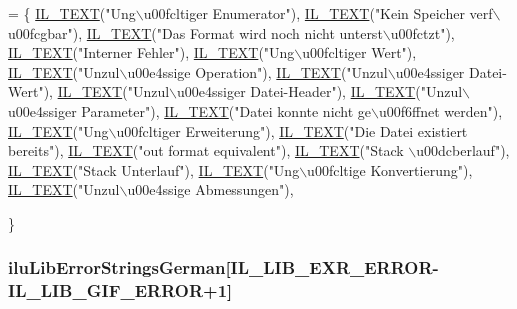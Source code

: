 \begin{DoxyCode}
= \{
    \hyperlink{il_8h_a2907c2129d2ba2ebbae6aa6a69b7f685}{IL\_TEXT}(\textcolor{stringliteral}{"Ung\(\backslash\)u00fcltiger Enumerator"}),
  \hyperlink{il_8h_a2907c2129d2ba2ebbae6aa6a69b7f685}{IL\_TEXT}(\textcolor{stringliteral}{"Kein Speicher verf\(\backslash\)u00fcgbar"}),
    \hyperlink{il_8h_a2907c2129d2ba2ebbae6aa6a69b7f685}{IL\_TEXT}(\textcolor{stringliteral}{"Das Format wird noch nicht unterst\(\backslash\)u00fctzt"}),
    \hyperlink{il_8h_a2907c2129d2ba2ebbae6aa6a69b7f685}{IL\_TEXT}(\textcolor{stringliteral}{"Interner Fehler"}),
    \hyperlink{il_8h_a2907c2129d2ba2ebbae6aa6a69b7f685}{IL\_TEXT}(\textcolor{stringliteral}{"Ung\(\backslash\)u00fcltiger Wert"}),
  \hyperlink{il_8h_a2907c2129d2ba2ebbae6aa6a69b7f685}{IL\_TEXT}(\textcolor{stringliteral}{"Unzul\(\backslash\)u00e4ssige Operation"}),
    \hyperlink{il_8h_a2907c2129d2ba2ebbae6aa6a69b7f685}{IL\_TEXT}(\textcolor{stringliteral}{"Unzul\(\backslash\)u00e4ssiger Datei-Wert"}),
    \hyperlink{il_8h_a2907c2129d2ba2ebbae6aa6a69b7f685}{IL\_TEXT}(\textcolor{stringliteral}{"Unzul\(\backslash\)u00e4ssiger Datei-Header"}),
    \hyperlink{il_8h_a2907c2129d2ba2ebbae6aa6a69b7f685}{IL\_TEXT}(\textcolor{stringliteral}{"Unzul\(\backslash\)u00e4ssiger Parameter"}),
    \hyperlink{il_8h_a2907c2129d2ba2ebbae6aa6a69b7f685}{IL\_TEXT}(\textcolor{stringliteral}{"Datei konnte nicht ge\(\backslash\)u00f6ffnet werden"}),
    \hyperlink{il_8h_a2907c2129d2ba2ebbae6aa6a69b7f685}{IL\_TEXT}(\textcolor{stringliteral}{"Ung\(\backslash\)u00fcltiger Erweiterung"}),
    \hyperlink{il_8h_a2907c2129d2ba2ebbae6aa6a69b7f685}{IL\_TEXT}(\textcolor{stringliteral}{"Die Datei existiert bereits"}),
    \hyperlink{il_8h_a2907c2129d2ba2ebbae6aa6a69b7f685}{IL\_TEXT}(\textcolor{stringliteral}{"out format equivalent"}),
    \hyperlink{il_8h_a2907c2129d2ba2ebbae6aa6a69b7f685}{IL\_TEXT}(\textcolor{stringliteral}{"Stack \(\backslash\)u00dcberlauf"}),
  \hyperlink{il_8h_a2907c2129d2ba2ebbae6aa6a69b7f685}{IL\_TEXT}(\textcolor{stringliteral}{"Stack Unterlauf"}),
    \hyperlink{il_8h_a2907c2129d2ba2ebbae6aa6a69b7f685}{IL\_TEXT}(\textcolor{stringliteral}{"Ung\(\backslash\)u00fcltige Konvertierung"}),
    \hyperlink{il_8h_a2907c2129d2ba2ebbae6aa6a69b7f685}{IL\_TEXT}(\textcolor{stringliteral}{"Unzul\(\backslash\)u00e4ssige Abmessungen"}),

\}
\end{DoxyCode}
\hypertarget{ilu__err-german_8h_a05e5776f0083644b5f62a53e3d1d728f}{
\subsubsection[{ilu\-Lib\-Error\-Strings\-German}]{ ilu\-Lib\-Error\-Strings\-German\mbox{[}{\bf I\-L\-\_\-\-L\-I\-B\-\_\-\-E\-X\-R\-\_\-\-E\-R\-R\-O\-R}-\/{\bf I\-L\-\_\-\-L\-I\-B\-\_\-\-G\-I\-F\-\_\-\-E\-R\-R\-O\-R}+1\mbox{]}}}\label{ilu__err-german_8h_a05e5776f0083644b5f62a53e3d1d728f}
